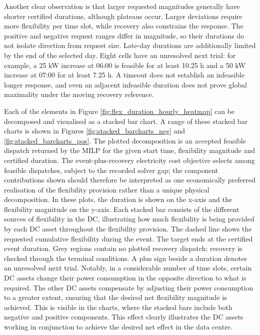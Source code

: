 \documentclass[lettersize,journal]{IEEEtran}
\newcommand{\rev}[1]{#1}
\begin{document}
Another clear observation is that larger requested magnitudes generally have shorter certified durations, although plateaus occur. Larger deviations require more flexibility per time slot, while recovery also constrains the response. The positive and negative request ranges differ in magnitude, so their durations do not isolate direction from request size. Late-day durations are additionally limited by the end of the selected day. Eight cells have an unresolved next trial: for example, a 25 kW increase at 06:00 is feasible for at least 10.25 h and a 50 kW increase at 07:00 for at least 7.25 h. A timeout does not establish an infeasible longer response, and even an adjacent infeasible duration does not prove global maximality under the moving recovery reference.

Each of the elements in Figure \ref{fig:flex_duration_hourly_heatmap} can be decomposed and visualised as a stacked bar chart. A range of these stacked bar charts is shown in Figures \ref{fig:stacked_barcharts_neg} and \ref{fig:stacked_barcharts_pos}. \rev{The plotted decomposition is an accepted feasible dispatch returned by the MILP for the given start time, flexibility magnitude and certified duration. The event-plus-recovery electricity cost objective selects among feasible dispatches, subject to the recorded solver gap; the component contributions shown should therefore be interpreted as one economically preferred realisation of the flexibility provision rather than a unique physical decomposition.} In these plots, the duration is shown on the x-axis and the flexibility magnitude on the y-axis. Each stacked bar consists of the different sources of flexibility in the DC, illustrating how much flexibility is being provided by each DC asset throughout the flexibility provision. The dashed line shows the requested cumulative flexibility during the event. The target ends at the certified event duration. Grey regions contain no plotted recovery dispatch; recovery is checked through the terminal conditions. A plus sign beside a duration denotes an unresolved next trial. Notably, in a considerable number of time slots, certain DC assets change their power consumption in the opposite direction to what is required. The other DC assets compensate by adjusting their power consumption to a greater extent, ensuring that the desired net flexibility magnitude is achieved. This is visible in the charts, where the stacked bars include both negative and positive components. This effect clearly illustrates the DC assets working in conjunction to achieve the desired net effect in the data centre.
\end{document}
